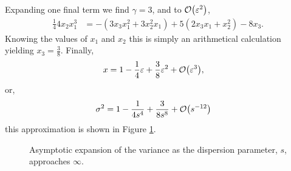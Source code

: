 Expanding one final term we find $\gamma = 3$, and to $\bigO{\eps^2}$,
\begin{align*}
\frac{1}{4} 4x_2 x_1^3 &= -(3x_3 x_1^2 + 3x_2^2 x_1) + 5(2x_3 x_1 + x_2^2) - 8x_3.
\end{align*}
Knowing the values of $x_1$ and $x_2$ this is simply an arithmetical calculation yielding $x_3 = \frac{3}{8}$. Finally,
\begin{align*}
x &= 1 - \frac{1}{4}\eps + \frac{3}{8}\eps^2 + \bigO{\eps^3},
\end{align*}
or,
\begin{align*}
\sigma^2 &= 1 - \frac{1}{4s^4} + \frac{3}{8s^8} + \bigO{s^{-12}}
\end{align*}
this approximation is shown in Figure \ref{fig:limsinfty}. \\
\begin{figure}[tbp]

\caption[Asymptotic expansion of the variance as the dispersion parameter approaches $\infty$.]{Asymptotic expansion of the variance as the dispersion parameter, $s$, approaches $\infty$.}
\label{fig:limsinfty}
\end{figure}

